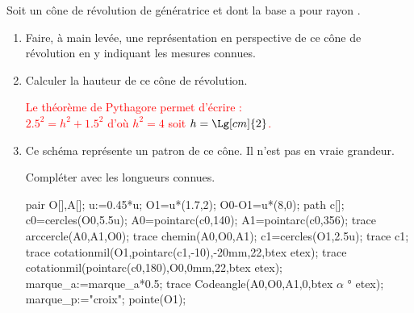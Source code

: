 \begin{corrige}
    Soit un cône de révolution de génératrice  et dont la base a pour rayon .
    \begin{enumerate}
        \item Faire, à main levée, une représentation en perspective de ce cône de révolution en y indiquant les mesures connues.
        \item Calculer la hauteur de ce cône de révolution.
        
        \textcolor{red}{Le théorème de Pythagore permet d'écrire :\\$\num{2.5}^2=h^2+\num{1.5}^2$ d'où $h^2=4$ soit $h=\Lg[cm]{2}$.}
        \item Ce schéma représente un patron de ce cône. Il n'est pas en vraie grandeur.
        
        Compléter avec les longueurs connues.
        \begin{Geometrie}[CoinBG={(-4u,-2u)}]
            pair O[],A[];
            u:=0.45*u;
            O1=u*(1.7,2);
            O0-O1=u*(8,0);            
            path c[];
            c0=cercles(O0,5.5u);
            A0=pointarc(c0,140);
            A1=pointarc(c0,356);
            trace arccercle(A0,A1,O0);
            trace chemin(A0,O0,A1);
            c1=cercles(O1,2.5u);
            trace c1;
            trace cotationmil(O1,pointarc(c1,-10),-20mm,22,btex \textcolor{red}{} etex);
            trace cotationmil(pointarc(c0,180),O0,0mm,22,btex \textcolor{red}{} etex);
            marque_a:=marque_a*0.5;
            trace Codeangle(A0,O0,A1,0,btex $\alpha$ ° etex);
            marque_p:="croix";
            pointe(O1);        
        \end{Geometrie}


\end{enumerate}
\end{corrige}
